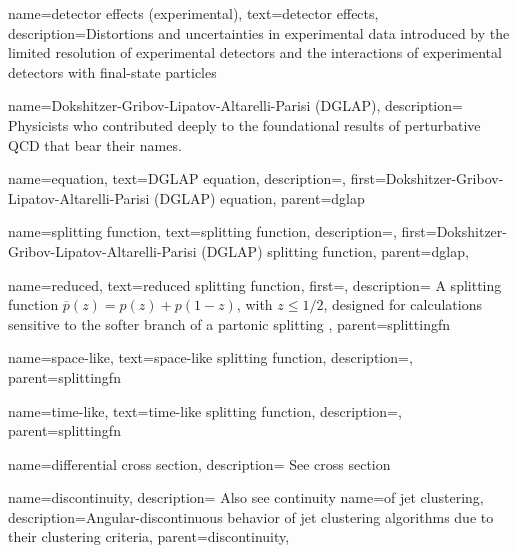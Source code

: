 {
    name=detector effects (experimental),
    text=detector effects,
    description={Distortions and uncertainties in experimental data introduced by the limited resolution of experimental detectors and the interactions of experimental detectors with final-state particles}
}



{
    name=Dokshitzer-Gribov-Lipatov-Altarelli-Parisi (DGLAP),
    description={
        Physicists who contributed deeply to the foundational results of perturbative QCD that bear their names.
    }
}

    {
      name=equation,
      text=DGLAP equation,
      description={},
      first=Dokshitzer-Gribov-Lipatov-Altarelli-Parisi (DGLAP) equation,
      parent=dglap
    }

    {
      name=splitting function,
      text=splitting function,
      description={},
      first=Dokshitzer-Gribov-Lipatov-Altarelli-Parisi (DGLAP) splitting function,
      parent=dglap,
    }

        {
          name=reduced,
          text=reduced splitting function,
          first=,
          description={
            A splitting function \(\overline{p}(z) = p(z) + p(1-z)\), with \(z \leq 1/2\), designed for calculations sensitive to the softer branch of a partonic splitting
          },
          parent=splittingfn
        }

        {
          name=space-like,
          text=space-like splitting function,
          description={},
          parent=splittingfn
        }

        {
          name=time-like,
          text=time-like splitting function,
          description={},
          parent=splittingfn
        }



{
    name=differential cross section,
    description={
        See cross section
    }
}


{
    name=discontinuity,
    description={
        Also see continuity
    }
}
    {
        name=of jet clustering,
        description={Angular-discontinuous behavior of jet clustering algorithms due to their clustering criteria},
        parent=discontinuity,
    }

